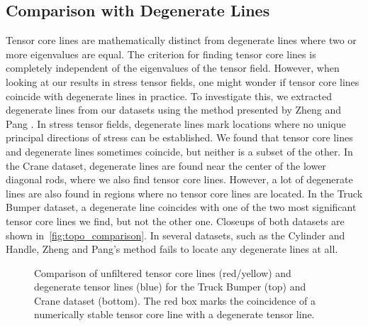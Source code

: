 \subsection{Comparison with Degenerate Lines} %
\label{sub:comparison_with_degenerate_lines}
%
Tensor core lines are mathematically distinct from degenerate lines where two or
more eigenvalues are equal.
%
The criterion for finding tensor core lines is completely independent of the
eigenvalues of the tensor field.
%
However, when looking at our results in stress tensor fields, one might wonder
if tensor core lines coincide with degenerate lines in practice.
%
To investigate this, we extracted degenerate lines from our datasets using the
method presented by Zheng and Pang \cite{Zheng2004}.
%
In stress tensor fields, degenerate lines mark locations where no unique
principal directions of stress can be established.
%
We found that tensor core lines and degenerate lines sometimes coincide, but
neither is a subset of the other.
%
In the Crane dataset, degenerate lines are found near the center of the lower
diagonal rods, where we also find tensor core lines.
%
However, a lot of degenerate lines are also found in regions where no tensor
core lines are located.
%
In the Truck Bumper dataset, a degenerate line coincides with one of the two
most significant tensor core lines we find, but not the other one.
%
Closeups of both datasets are shown in~\autoref{fig:topo_comparison}.
%
In several datasets, such as the Cylinder and Handle, Zheng and Pang's method
fails to locate any degenerate lines at all.
%
\begin{figure}[t]
    \centering
    \setlength{\figurewidth}{0.8\textwidth}
    
    \caption{Comparison of unfiltered tensor core lines (red/yellow) and
    degenerate tensor lines (blue) for the Truck Bumper (top) and Crane dataset
    (bottom). The red box marks the coincidence of a numerically stable tensor
    core line with a degenerate tensor line.}
    \label{fig:topo_comparison}
\end{figure}
%
%

